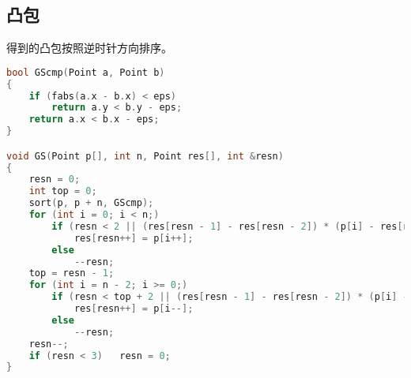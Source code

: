 \subsection{凸包}
    得到的凸包按照逆时针方向排序。
    \begin{lstlisting}[language=c++]
bool GScmp(Point a, Point b)
{
    if (fabs(a.x - b.x) < eps)
        return a.y < b.y - eps;
    return a.x < b.x - eps;
}

void GS(Point p[], int n, Point res[], int &resn)
{
    resn = 0;
    int top = 0;
    sort(p, p + n, GScmp);
    for (int i = 0; i < n;)
        if (resn < 2 || (res[resn - 1] - res[resn - 2]) * (p[i] - res[resn - 1]) > eps)
            res[resn++] = p[i++];
        else
            --resn;
    top = resn - 1;
    for (int i = n - 2; i >= 0;)
        if (resn < top + 2 || (res[resn - 1] - res[resn - 2]) * (p[i] - res[resn - 1]) > eps)
            res[resn++] = p[i--];
        else
            --resn;
    resn--;
    if (resn < 3)   resn = 0;
}
    \end{lstlisting}
    
